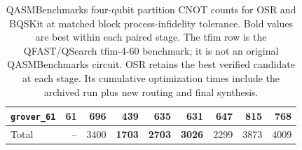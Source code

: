 \begin{table}[p]
\begin{tabular}{lrr|rrr|rrr}
\texttt{grover\_61} & 61 & 696 & \textbf{439} & \textbf{635} & \textbf{631} & 647 & 815 & 768 \\
\hline
Total & -- & 3400 & \textbf{1703} & \textbf{2703} & \textbf{3026} & 2299 & 3873 & 4009 \\
\hline
\end{tabular}
\caption{QASMBenchmarks four-qubit partition CNOT counts for OSR and BQSKit at matched block process-infidelity tolerance. Bold values are best within each paired stage. The tfim row is the QFAST/QSearch tfim-4-60 benchmark; it is not an original QASMBenchmarks circuit. OSR retains the best verified candidate at each stage. Its cumulative optimization times include the archived run plus new routing and final synthesis.}
\label{tab:osr-bqskit-four-qubit-qasm-benchmarks-counts}
\end{table}

